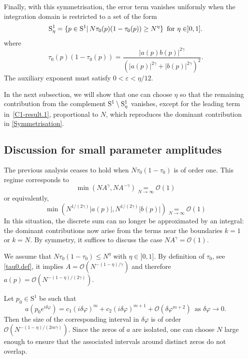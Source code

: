 \documentclass[pdflatex,sn-mathphys-num]{sn-jnl}
\theoremstyle{thmstyleone}
\numberwithin{equation}{section}
\newcommand{\Sp}{\mathrm{S}^{1}}
\begin{document}
Finally, with this symmetrisation, the error term vanishes uniformly when the integration domain is restricted to a set of the form
\begin{equation}
{\rm S}^{1}_{\eta}=\{p\in {\rm S}^1|\,N\tau_0(p)(1-\tau_0(p))\geq N^{\eta}\}\,\text{ for }\eta\in]0,1].
\end{equation}
where 
\begin{equation}
\tau_0(p)(1-\tau_0(p))=\frac{|a(p)b(p)|^{2\gamma}}{(|a(p)|^{2\gamma}+|b(p)|^{2\gamma})^2}.
\end{equation}
The auxiliary exponent must satisfy $0<\varepsilon<\eta/12$.


In the next subsection, we will show that one can choose $\eta$ so that the remaining contribution from the complement ${\rm S}^{1}\setminus{\rm S}^{1}_{\eta}$ vanishes, except for the leading term in~\eqref{C1-result.1}, proportional to $N$, which reproduces the dominant contribution in \eqref{Symmetrisation}.

\subsection{Discussion for small parameter amplitudes}\label{sec:zero}

The previous analysis ceases to hold when $N\tau_0(1-\tau_0)$ is of order one. This regime corresponds to
\begin{equation}
    \min\left(NA^\gamma,NA^{-\gamma}\right)\underset{N\to\infty}{=}\mathcal{O}(1)
\end{equation}
or equivalently,
\begin{equation}
    \min\left(N^{1/(2\gamma)}|a(p)|,N^{1/(2\gamma)}|b(p)|\right)\underset{N\to\infty}{=}\mathcal{O}(1)
\end{equation}
In this situation, the discrete sum can no longer be approximated by an integral: the dominant contributions now arise from the terms near the boundaries $k=1$ or $k=N$. By symmetry, it suffices to discuss the case $NA^\gamma=\mathcal{O}(1)$. 

We assume that $N\tau_0(1-\tau_0)\leq N^{\eta}$ with $\eta\in]0,1]$. By definition of $\tau_{0}$, see \eqref{tau0.def}, it implies $A=\mathcal{O}(N^{-(1-\eta)/\gamma})$ and therefore $a(p)=\mathcal{O}(N^{-(1-\eta)/(2\gamma)})$.


Let $p_{0}\in\Sp$ be such that
\begin{equation}
    a(p_0e^{i\delta \varphi})=c_1(i\delta\varphi)^m+c_2(i\delta\varphi)^{m+1}+\mathcal{O}(\delta\varphi^{m+2})\,\text{ as }\delta\varphi\to 0.
\end{equation}
Then the size of the corresponding interval in $\delta\varphi$ is of order $\mathcal{O}(N^{-(1-\eta)/(2m\gamma)})$. Since the zeros of $a$ are isolated, one can choose $N$ large enough to ensure that the associated intervals around distinct zeros do not overlap.
\end{document}
